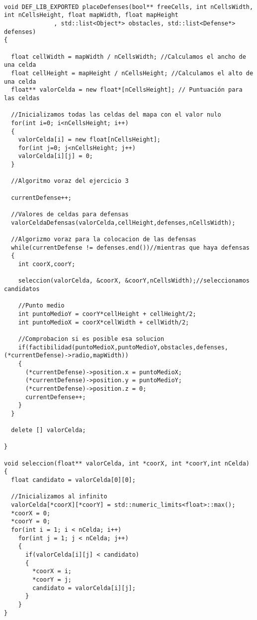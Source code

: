 \begin{lstlisting}

void DEF_LIB_EXPORTED placeDefenses(bool** freeCells, int nCellsWidth, int nCellsHeight, float mapWidth, float mapHeight
              , std::list<Object*> obstacles, std::list<Defense*> defenses) 
{

  float cellWidth = mapWidth / nCellsWidth; //Calculamos el ancho de una celda
  float cellHeight = mapHeight / nCellsHeight; //Calculamos el alto de una celda
  float** valorCelda = new float*[nCellsHeight]; // Puntuación para las celdas

  //Inicializamos todas las celdas del mapa con el valor nulo
  for(int i=0; i<nCellsHeight; i++)
  {
    valorCelda[i] = new float[nCellsHeight];
    for(int j=0; j<nCellsHeight; j++)
    valorCelda[i][j] = 0;
  }

  //Algoritmo voraz del ejercicio 3

  currentDefense++;

  //Valores de celdas para defensas
  valorCeldaDefensas(valorCelda,cellHeight,defenses,nCellsWidth);

  //Algorizmo voraz para la colocacion de las defensas
  while(currentDefense != defenses.end())//mientras que haya defensas
  {
    int coorX,coorY;

    seleccion(valorCelda, &coorX, &coorY,nCellsWidth);//seleccionamos candidatos
    
    //Punto medio
    int puntoMedioY = coorY*cellHeight + cellHeight/2;
    int puntoMedioX = coorX*cellWidth + cellWidth/2;
    
    //Comprobacion si es posible esa solucion
    if(factibilidad(puntoMedioX,puntoMedioY,obstacles,defenses,(*currentDefense)->radio,mapWidth))
    {   
      (*currentDefense)->position.x = puntoMedioX;
      (*currentDefense)->position.y = puntoMedioY;
      (*currentDefense)->position.z = 0; 
      currentDefense++;
    }
  }

  delete [] valorCelda;
    
}

void seleccion(float** valorCelda, int *coorX, int *coorY,int nCelda)
{
  float candidato = valorCelda[0][0];
  
  //Inicializamos al infinito
  valorCelda[*coorX][*coorY] = std::numeric_limits<float>::max();
  *coorX = 0;
  *coorY = 0;
  for(int i = 1; i < nCelda; i++)
    for(int j = 1; j < nCelda; j++)
    {
      if(valorCelda[i][j] < candidato)
      {
        *coorX = i;
        *coorY = j;
        candidato = valorCelda[i][j];
      }
    }
}

\end{lstlisting}

